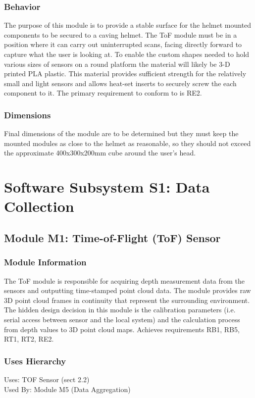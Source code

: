 \documentclass[11pt]{article}
\begin{document}
		\subsubsection{Behavior}
			The purpose of this module is to provide a stable surface for the helmet mounted components to be secured to a caving helmet. The ToF module must be in a position where it can carry out uninterrupted scans, facing directly forward to capture what the user is looking at. To enable the custom shapes needed to hold various sizes of sensors on a round platform the material will likely be 3-D printed PLA plastic. This material provides sufficient strength for the relatively small and light sensors and allows heat-set inserts to securely screw the each component to it. The primary requirement to conform to is RE2.
		\subsubsection{Dimensions}
			Final dimensions of the module are to be determined but they must keep the mounted modules as close to the helmet as reasonable, so they should not exceed the approximate 400x300x200mm cube around the user’s head. 

	\section{Software Subsystem S1: Data Collection}

		\subsection{Module M1: Time-of-Flight (ToF) Sensor}
		\label{sec:M1}
			\subsubsection{Module Information}
				The ToF module is responsible for acquiring depth measurement data from the sensors and outputting time-stamped point cloud data. The module provides raw 3D point cloud frames in continuity that represent the surrounding environment. The hidden design decision in this module is the calibration parameters (i.e. serial access between sensor and the local system) and the calculation process from depth values to 3D point cloud maps. Achieves requirements RB1, RB5, RT1, RT2, RE2.
			\subsubsection{Uses Hierarchy}
			Uses: TOF Sensor (sect 2.2) \\
			Used By: Module M5 (Data Aggregation)
\end{document}
